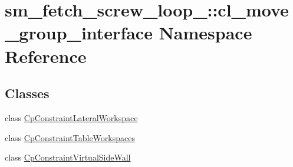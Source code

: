 \hypertarget{namespacesm__fetch__screw__loop__1_1_1cl__move__group__interface}{}\section{sm\+\_\+fetch\+\_\+screw\+\_\+loop\+\_\+:\+:cl\+\_\+move\+\_\+group\+\_\+interface Namespace Reference}
\label{namespacesm__fetch__screw__loop__1_1_1cl__move__group__interface}
\subsection*{Classes}
\begin{DoxyCompactItemize}
\item 
class \hyperlink{classsm__fetch__screw__loop__1_1_1cl__move__group__interface_1_1CpConstraintLateralWorkspace}{Cp\+Constraint\+Lateral\+Workspace}
\item 
class \hyperlink{classsm__fetch__screw__loop__1_1_1cl__move__group__interface_1_1CpConstraintTableWorkspaces}{Cp\+Constraint\+Table\+Workspaces}
\item 
class \hyperlink{classsm__fetch__screw__loop__1_1_1cl__move__group__interface_1_1CpConstraintVirtualSideWall}{Cp\+Constraint\+Virtual\+Side\+Wall}
\end{DoxyCompactItemize}
